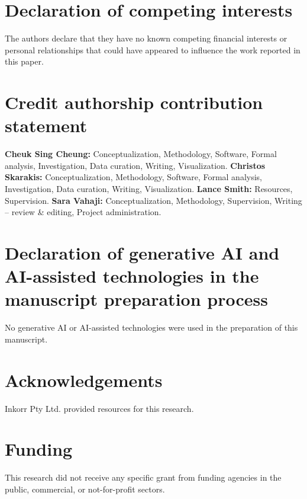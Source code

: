 \documentclass[review,12pt]{elsarticle}
\begin{document}
\section*{Declaration of competing interests}

The authors declare that they have no known competing financial interests or personal relationships that could have appeared to influence the work reported in this paper.

\section*{Credit authorship contribution statement}

\textbf{Cheuk Sing Cheung:} Conceptualization, Methodology, Software, Formal analysis, Investigation, Data curation, Writing, Visualization. \textbf{Christos Skarakis:} Conceptualization, Methodology, Software, Formal analysis, Investigation, Data curation, Writing, Visualization. \textbf{Lance Smith:} Resources, Supervision. \textbf{Sara Vahaji:} Conceptualization, Methodology, Supervision, Writing -- review \& editing, Project administration.

\section*{Declaration of generative AI and AI-assisted technologies in the manuscript preparation process}

No generative AI or AI-assisted technologies were used in the preparation of this manuscript.

\section*{Acknowledgements}

Inkorr Pty Ltd. provided resources for this research.

\section*{Funding}

This research did not receive any specific grant from funding agencies in the public, commercial, or not-for-profit sectors.


\nocite{*}

\end{document}
